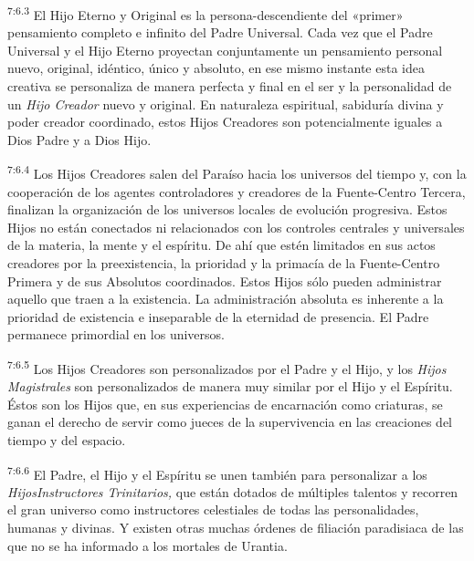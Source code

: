 \par
\textsuperscript{7:6.3} El Hijo Eterno y Original es la persona-descendiente del «primer» pensamiento completo e infinito del Padre Universal. Cada vez que el Padre Universal y el Hijo Eterno proyectan conjuntamente un pensamiento personal nuevo, original, idéntico, único y absoluto, en ese mismo instante esta idea creativa se personaliza de manera perfecta y final en el ser y la personalidad de un \textit{Hijo Creador} nuevo y original. En naturaleza espiritual, sabiduría divina y poder creador coordinado, estos Hijos Creadores son potencialmente iguales a Dios Padre y a Dios Hijo.

\par
\textsuperscript{7:6.4} Los Hijos Creadores salen del Paraíso hacia los universos del tiempo y, con la cooperación de los agentes controladores y creadores de la Fuente-Centro Tercera, finalizan la organización de los universos locales de evolución progresiva. Estos Hijos no están conectados ni relacionados con los controles centrales y universales de la materia, la mente y el espíritu. De ahí que estén limitados en sus actos creadores por la preexistencia, la prioridad y la primacía de la Fuente-Centro Primera y de sus Absolutos coordinados. Estos Hijos sólo pueden administrar aquello que traen a la existencia. La administración absoluta es inherente a la prioridad de existencia e inseparable de la eternidad de presencia. El Padre permanece primordial en los universos.

\par
\textsuperscript{7:6.5} Los Hijos Creadores son personalizados por el Padre y el Hijo, y los \textit{Hijos Magistrales} son personalizados de manera muy similar por el Hijo y el Espíritu. Éstos son los Hijos que, en sus experiencias de encarnación como criaturas, se ganan el derecho de servir como jueces de la supervivencia en las creaciones del tiempo y del espacio.

\par
\textsuperscript{7:6.6} El Padre, el Hijo y el Espíritu se unen también para personalizar a los \textit{HijosInstructores Trinitarios,} que están dotados de múltiples talentos y recorren el gran universo como instructores celestiales de todas las personalidades, humanas y divinas. Y existen otras muchas órdenes de filiación paradisiaca de las que no se ha informado a los mortales de Urantia.

